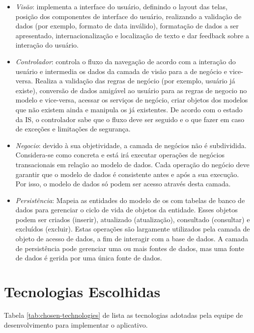 \documentclass[envcountsame,envcountchap]{svmono}
\begin{document}
\begin{itemize}
\item \textit{Visão}: implementa a interface do usuário, definindo o layout das telas, posição dos componentes de interface do usuário, realizando a validação de dados (por exemplo, formato de data inválido), formatação de dados a ser apresentado, internacionalização e localização de texto e dar feedback sobre a interação do usuário.

\item \textit{Controlador}: controla o fluxo da navegação de acordo com a interação do usuário e intermedia os dados da camada de visão para a de negócio e vice-versa. Realiza a validação das regras de negócio (por exemplo, usuário já existe), conversão de dados amigável ao usuário para as regras de negocio no modelo e vice-versa, acessar os serviços de negócio, criar objetos dos modelos que não existem ainda e manipula os já existentes. De acordo com o estado da IS, o controlador sabe que o fluxo deve ser seguido e o que fazer em caso de exceções e limitações de segurança.

\item \textit{Negocio}: devido à sua objetividade, a camada de negócios não é subdividida. Considera-se como concreta e está irá executar operações de negócios transacionais em relação ao modelo de dados. Cada operação do negócio deve garantir que o modelo de dados é consistente antes e após a sua execução. Por isso, o modelo de dados só podem ser acesso através desta camada.

\item \textit{Persistência}: Mapeia as entidades do modelo de os com tabelas de banco de dados para gerenciar o ciclo de vida de objetos da entidade. Esses objetos podem ser criados (inserir), atualizado (atualização), consultado (consultar) e excluídos (excluir). Estas operações são largamente utilizados pela camada de objeto de acesso de dados, a fim de interagir com a base de dados. A camada de persistência pode gerenciar uma ou mais fontes de dados, mas uma fonte de dados é gerida por uma única fonte de dados.
\end{itemize}

\section{Tecnologias Escolhidas}

Tabela \ref{tab:chosen-technologies} de lista as tecnologias adotadas pela equipe de desenvolvimento para implementar o aplicativo.
\end{document}
